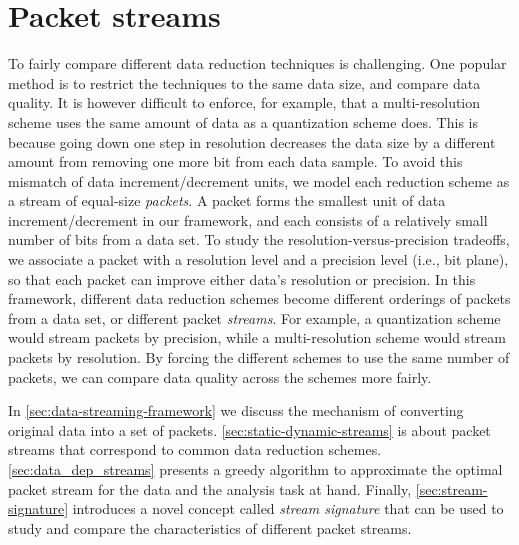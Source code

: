 \section{Packet streams}
\label{sec:terminologies}

To fairly compare different data reduction techniques is challenging. One popular method is to
restrict the techniques to the same data size, and compare data quality. It is however difficult to
enforce, for example, that a multi-resolution scheme uses the same amount of data as a quantization
scheme does. This is because going down one step in resolution decreases the data size by a
different amount from removing one more bit from each data sample. To avoid this mismatch of data
increment/decrement units, we model each reduction scheme as a stream of equal-size \emph{packets}.
A packet forms the smallest unit of data increment/decrement in our framework, and each consists of
a relatively small number of bits from a data set. To study the resolution-versus-precision
tradeoffs, we associate a packet with a resolution level and a precision level (i.e., bit plane), so
that each packet can improve either data's resolution or precision. In this framework, different
data reduction schemes become different orderings of packets from a data set, or different packet
\emph{streams}. For example, a quantization scheme would stream packets by precision, while a
multi-resolution scheme would stream packets by resolution. By forcing the different schemes to use
the same number of packets, we can compare data quality across the schemes more fairly.

In \autoref{sec:data-streaming-framework} we discuss the mechanism of converting original data into
a set of packets. \autoref{sec:static-dynamic-streams} is about packet streams that correspond to
common data reduction schemes. \autoref{sec:data_dep_streams} presents a greedy algorithm to
approximate the optimal packet stream for the data and the analysis task at hand. Finally,
\autoref{sec:stream-signature} introduces a novel concept called \emph{stream signature} that can be
used to study and compare the characteristics of different packet streams.

